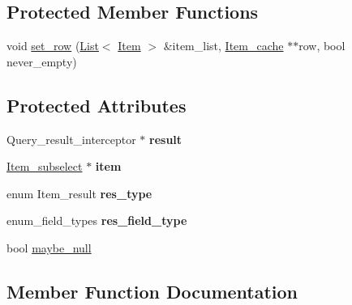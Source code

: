 \subsection*{Protected Member Functions}
\begin{DoxyCompactItemize}
\item 
void \mbox{\hyperlink{classsubselect__engine_a34d0d6c15d4ed548b014d2703f6de14f}{set\+\_\+row}} (\mbox{\hyperlink{classList}{List}}$<$ \mbox{\hyperlink{classItem}{Item}} $>$ \&item\+\_\+list, \mbox{\hyperlink{classItem__cache}{Item\+\_\+cache}} $\ast$$\ast$row, bool never\+\_\+empty)
\end{DoxyCompactItemize}
\subsection*{Protected Attributes}
\begin{DoxyCompactItemize}
\item 
\mbox{\label{classsubselect__engine_a97c54daa73b977893487bfac4db22235}} 
Query\+\_\+result\+\_\+interceptor $\ast$ {\bfseries result}
\item 
\mbox{\label{classsubselect__engine_ac80ce753a30f1fbd7f2ecea22204cd9a}} 
\mbox{\hyperlink{classItem__subselect}{Item\+\_\+subselect}} $\ast$ {\bfseries item}
\item 
\mbox{\label{classsubselect__engine_aee724a9cc1014b839a110cb44dda38f1}} 
enum Item\+\_\+result {\bfseries res\+\_\+type}
\item 
\mbox{\label{classsubselect__engine_ac36a9feded62c068201f7595817b0dcb}} 
enum\+\_\+field\+\_\+types {\bfseries res\+\_\+field\+\_\+type}
\item 
bool \mbox{\hyperlink{classsubselect__engine_aeaf5e2267f8630b72fa59e4c182f777a}{maybe\+\_\+null}}
\end{DoxyCompactItemize}


\subsection{Member Function Documentation}
\mbox{\label{classsubselect__engine_a0f0051f24ecc4b20f0e3f8d817293276}} 
